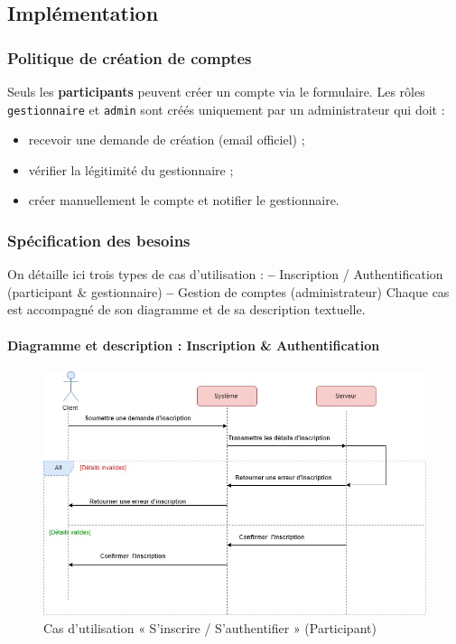 \subsection{Implémentation}

\subsubsection{Politique de création de comptes}
Seuls les \textbf{participants} peuvent créer un compte via le formulaire.  
Les rôles \texttt{gestionnaire} et \texttt{admin} sont créés uniquement par un administrateur qui doit :
\begin{itemize}
  \item recevoir une demande de création (email officiel) ;
  \item vérifier la légitimité du gestionnaire ;
  \item créer manuellement le compte et notifier le gestionnaire.
\end{itemize}

\subsubsection{Spécification des besoins}
On détaille ici trois types de cas d’utilisation :  
\textbf{–} Inscription / Authentification (participant \& gestionnaire)  
\textbf{–} Gestion de comptes (administrateur)  
Chaque cas est accompagné de son diagramme et de sa description textuelle.

\paragraph{Diagramme et description : Inscription \& Authentification}
\begin{figure}[H]
  \centering
  \includegraphics[width=0.6\linewidth]{projet/images/diagramme de sequance/diagrame d'inscription utilisateur.png}
  \caption{Cas d'utilisation « S’inscrire / S’authentifier » (Participant)}
  \label{fig:uc-participant}
\end{figure}

